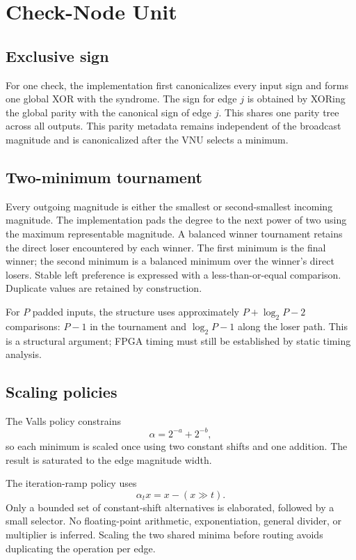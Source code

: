 \documentclass[10pt,conference]{IEEEtran}
\begin{document}
\section{Check-Node Unit}
\subsection{Exclusive sign}
For one check, the implementation first canonicalizes every input sign and
forms one global XOR with the syndrome.  The sign for edge $j$ is obtained by
XORing the global parity with the canonical sign of edge $j$.  This shares one
parity tree across all outputs.  This parity metadata remains independent of
the broadcast magnitude and is canonicalized after the VNU selects a minimum.

\subsection{Two-minimum tournament}
Every outgoing magnitude is either the smallest or second-smallest incoming
magnitude.  The implementation pads the degree to the next power of two using
the maximum representable magnitude.  A balanced winner tournament retains the
direct loser encountered by each winner.  The first minimum is the final
winner; the second minimum is a balanced minimum over the winner's direct
losers.  Stable left preference is expressed with a less-than-or-equal
comparison.  Duplicate values are retained by construction.

For $P$ padded inputs, the structure uses approximately
$P+\log_2P-2$ comparisons: $P-1$ in the tournament and
$\log_2P-1$ along the loser path.  This is a structural argument; FPGA timing
must still be established by static timing analysis.

\subsection{Scaling policies}
The Valls policy constrains
\begin{equation}
 \alpha=2^{-a}+2^{-b},
\end{equation}
so each minimum is scaled once using two constant shifts and one addition.
The result is saturated to the edge magnitude width.

The iteration-ramp policy uses
\begin{equation}
 \alpha_t x = x-(x\gg t).
\end{equation}
Only a bounded set of constant-shift alternatives is elaborated, followed by a
small selector.  No floating-point arithmetic, exponentiation, general
divider, or multiplier is inferred.  Scaling the two shared minima before
routing avoids duplicating the operation per edge.
\end{document}
